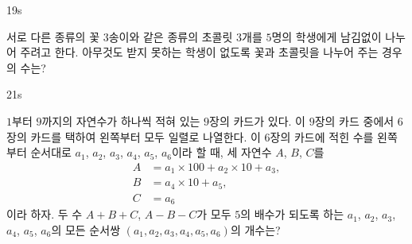 \documentclass[10pt]{article}
\begin{document}
\begin{pagepair}
\noindent
\begin{minipage}[t][\probboxheight][t]{0.46\linewidth}
\begin{problem}{19}{s}
\par\smallskip
서로 다른 종류의 꽃 $3$송이와 같은 종류의 초콜릿 $3$개를 $5$명의 학생에게 남김없이 나누어 주려고 한다. 아무것도 받지 못하는 학생이 없도록 꽃과 초콜릿을 나누어 주는 경우의 수는?
\begin{choices}
\end{choices}
\end{problem}
\end{minipage}\hfill
\begin{minipage}[t][\probboxheight][t]{0.46\linewidth}
\begin{problem}{21}{s}
\par\smallskip
$1$부터 $9$까지의 자연수가 하나씩 적혀 있는 $9$장의 카드가 있다. 이 $9$장의 카드 중에서 $6$장의 카드를 택하여 왼쪽부터 모두 일렬로 나열한다. 이 $6$장의 카드에 적힌 수를 왼쪽부터 순서대로 $a_1$, $a_2$, $a_3$, $a_4$, $a_5$, $a_6$이라 할 때, 세 자연수 $A$, $B$, $C$를
\begin{align*}
A &= a_1 \times 100 + a_2 \times 10 + a_3, \\
B &= a_4 \times 10 + a_5, \\
C &= a_6
\end{align*}
이라 하자. 두 수 $A + B + C$, $A - B - C$가 모두 $5$의 배수가 되도록 하는 $a_1$, $a_2$, $a_3$, $a_4$, $a_5$, $a_6$의 모든 순서쌍 $(a_1, a_2, a_3, a_4, a_5, a_6)$의 개수는?
\begin{choices}
\end{choices}
\end{problem}
\end{minipage}
\end{pagepair}
\end{document}
